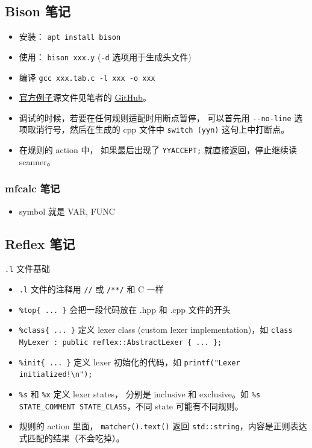 \subsection{Bison 笔记}
\begin{itemize}
\item 安装： \verb`apt install bison`
\item 使用： \verb`bison xxx.y` (\verb`-d` 选项用于生成头文件)
\item 编译 \verb`gcc xxx.tab.c -l xxx -o xxx`
\item \href{http://web.mit.edu/gnu/doc/html/bison_5.html}{官方例子}源文件见笔者的 \href{https://github.com/MacroUniverse/bison_test}{GitHub}。
\item 调试的时候，若要在任何规则适配时用断点暂停， 可以首先用 \verb`--no-line` 选项取消行号，然后在生成的 cpp 文件中 \verb`switch (yyn)` 这句上中打断点。
\item 在规则的 action 中， 如果最后出现了 \verb`YYACCEPT;` 就直接返回，停止继续读 scanner。
\end{itemize}

\subsubsection{mfcalc 笔记}
\begin{itemize}
\item symbol 就是 VAR, FUNC
\end{itemize}

\subsection{Reflex 笔记}
\verb`.l` 文件基础
\begin{itemize}
\item \verb`.l` 文件的注释用 \verb`//` 或 \verb`/**/` 和 C 一样
\item \verb`%top{ ... }` 会把一段代码放在 .hpp 和 .cpp 文件的开头
\item \verb`%class{ ... }` 定义 lexer class (custom lexer implementation)，如 \verb`class MyLexer : public reflex::AbstractLexer { ... };`
\item \verb`%init{ ... }` 定义 lexer 初始化的代码，如 \verb`printf("Lexer initialized!\n");`
\item \verb`%s` 和 \verb`%x` 定义 lexer states， 分别是 inclusive 和 exclusive。如 \verb`%s STATE_COMMENT STATE_CLASS`，不同 state 可能有不同规则。
\item 规则的 action 里面， \verb`matcher().text()` 返回 \verb`std::string`，内容是正则表达式匹配的结果（不会吃掉）。
\end{itemize}
